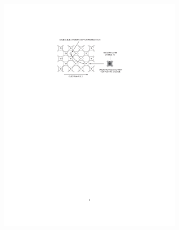\begin{figure}[htbp]
  \centering
  \begin{subfigure}[b]{0.45\textwidth}
    \includegraphics[width=\textwidth, trim = 65mm 192mm
      65mm 40mm, clip]{figures/ChargeSharing/doping_ntype.pdf}
    \caption{}\label{fig:doping_n}
  \end{subfigure}\hfill
  \begin{subfigure}[b]{0.45\textwidth}

\end{subfigure}
\end{figure}
